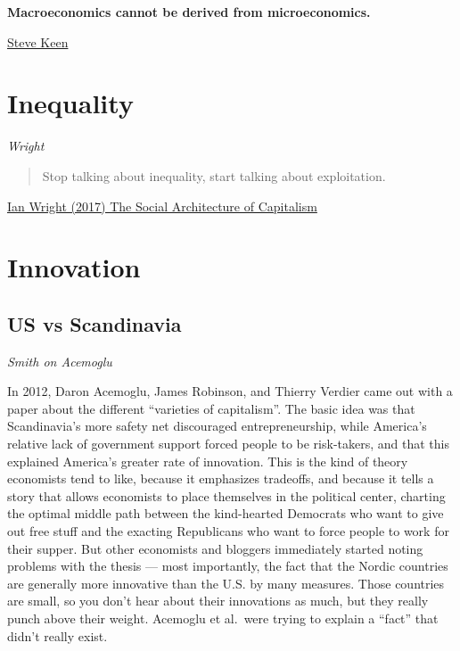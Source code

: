 \documentclass[
]{book}
\begin{document}
\textbf{Macroeconomics cannot be derived from microeconomics.}

\href{https://evonomics.com/why-economists-have-to-embrace-complexity-steve-keen/}{Steve Keen}

\hypertarget{inequality}{%
\chapter{Inequality}\label{inequality}}

\emph{Wright}

\begin{quote}
Stop talking about inequality, start talking about exploitation.
\end{quote}

\href{https://ianwrightsite.wordpress.com/2017/11/16/the-social-architecture-of-capitalism/}{Ian Wright (2017) The Social Architecture of Capitalism}

\hypertarget{innovation}{%
\chapter{Innovation}\label{innovation}}

\hypertarget{us-vs-scandinavia}{%
\section{US vs Scandinavia}\label{us-vs-scandinavia}}

\emph{Smith on Acemoglu}

In 2012, Daron Acemoglu, James Robinson, and Thierry Verdier came out with a paper about the different ``varieties of capitalism''. The basic idea was that Scandinavia's more safety net discouraged entrepreneurship, while America's relative lack of government support forced people to be risk-takers, and that this explained America's greater rate of innovation. This is the kind of theory economists tend to like, because it emphasizes tradeoffs, and because it tells a story that allows economists to place themselves in the political center, charting the optimal middle path between the kind-hearted Democrats who want to give out free stuff and the exacting Republicans who want to force people to work for their supper. But other economists and bloggers immediately started noting problems with the thesis --- most importantly, the fact that the Nordic countries are generally more innovative than the U.S. by many measures. Those countries are small, so you don't hear about their innovations as much, but they really punch above their weight. Acemoglu et al.~were trying to explain a ``fact'' that didn't really exist.
\end{document}
